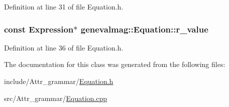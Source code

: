 Definition at line 31 of file Equation.h.

\hypertarget{classgenevalmag_1_1Equation_abdc49df03becf19ea7f5aa1b89b749c0}{
\subsubsection[{r\_\-value}]{\setlength{\rightskip}{0pt plus 5cm}const {\bf Expression}$\ast$ {\bf genevalmag::Equation::r\_\-value}}}
\label{classgenevalmag_1_1Equation_abdc49df03becf19ea7f5aa1b89b749c0}


Definition at line 36 of file Equation.h.



The documentation for this class was generated from the following files:\begin{DoxyCompactItemize}
\item 
include/Attr\_\-grammar/\hyperlink{Equation_8h}{Equation.h}\item 
src/Attr\_\-grammar/\hyperlink{Equation_8cpp}{Equation.cpp}\end{DoxyCompactItemize}
